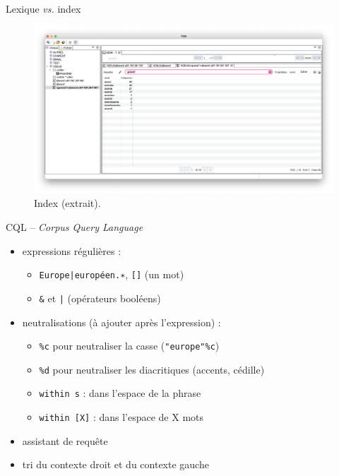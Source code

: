 \documentclass[xetex,xcolor={table,usenames,dvipsnames}]{beamer}
\begin{document}
\begin{frame}{Lexique \textit{vs.} index}
	\begin{figure}[h] %
		\centering
		\includegraphics[width=1\linewidth]{img/index.png}
		\caption{Index (extrait).}
		\label{fig:ling_out_TAL}
	\end{figure}
\end{frame}

\begin{frame}{\textsc{CQL} -- \textit{Corpus Query Language}}
	\begin{itemize}
		\item expressions régulières : 
		\begin{itemize}
		\item \texttt{Europe|européen.∗}, \texttt{[]} (un mot)
		\item \texttt{\&} et \texttt{|} (opérateurs booléens)
		\end{itemize}
		\item neutralisations (à ajouter après l’expression) :
		\begin{itemize}
			\item \texttt{\%c} pour neutraliser la casse (\texttt{"europe"\%c})
			\item \texttt{\%d} pour neutraliser les diacritiques (accents, cédille)
			\item \texttt{within s} : dans l’espace de la phrase
			\item \texttt{within [\textsc{X}]} : dans l'espace de \textsc{X} mots
		\end{itemize}
		\item assistant de requête
		\item tri du contexte droit et du contexte gauche
	\end{itemize}
\end{frame}
\end{document}
